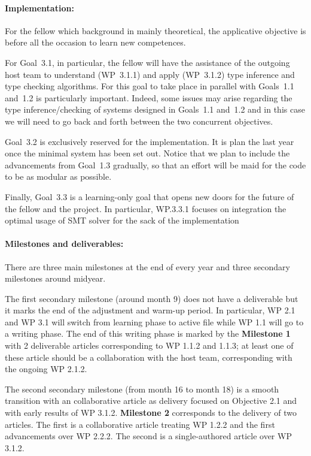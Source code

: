 \documentclass{article}[11pt]
\begin{document}
 
\paragraph{Implementation:}
For the fellow which background in mainly theoretical, the applicative objective is before all the occasion to learn new competences. 

For Goal~3.1, in particular, the fellow will have the assistance of the outgoing host team to understand (WP~3.1.1) and apply (WP~3.1.2) type inference and type checking algorithms. For this goal to take place in parallel with Goals~1.1 and~1.2 is particularly important. Indeed, some issues may arise regarding the type inference/checking of systems designed in Goals~1.1 and~1.2 and in this case we will need to go back and forth between the two concurrent objectives.

Goal~3.2 is exclusively reserved for the implementation. It is plan the last year once the minimal system has been set out. Notice that we plan to include the advancements from Goal~1.3 gradually, so that an effort will be maid for the code to be as modular as possible.

Finally, Goal~3.3 is a learning-only goal that opens new doors for the future of the fellow and the project. In particular, WP.3.3.1 focuses on integration the optimal usage of SMT solver for the sack of the implementation


\paragraph{Milestones and deliverables:}

There are three main milestones at the end of every year and three secondary milestones around midyear.

The first secondary milestone (around month 9) does not have a deliverable but  it marks the end of the adjustment and warm-up period. In particular, WP 2.1 and WP 3.1 will switch from learning phase to active file while WP 1.1 will go to a writing phase. The end of this writing phase is marked by the {\bf Milestone 1} with 2 deliverable articles corresponding to WP 1.1.2 and 1.1.3; at least one of these article should be a collaboration with the host team, corresponding with the ongoing WP 2.1.2.

The second secondary milestone (from month 16 to month 18) is a smooth transition with an collaborative article as delivery focused on Objective 2.1 and with early results of WP 3.1.2. {\bf Milestone 2} corresponds to the delivery of two articles. The first is a collaborative article treating WP 1.2.2 and the first advancements over WP 2.2.2. The second is a single-authored article over WP 3.1.2.
\end{document}
